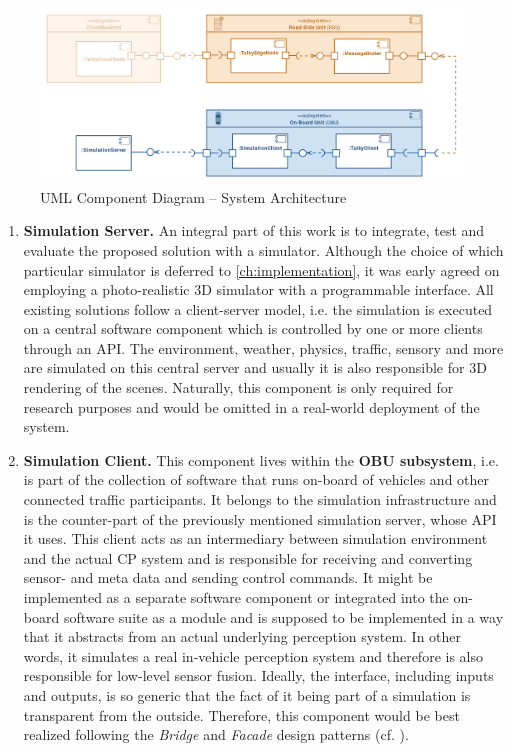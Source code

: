 \begin{figure}
	\centering
	\includegraphics[width=1\linewidth]{98_images/components_plain}
	\caption{UML Component Diagram – System Architecture}
	\label{fig:components_plain}
\end{figure}

\begin{enumerate}[C1: ]
	\item \textbf{Simulation Server.} An integral part of this work is to integrate, test and evaluate the proposed solution with a simulator. Although the choice of which particular simulator is deferred to \cref{ch:implementation}, it was early agreed on employing a photo-realistic 3D simulator with a programmable interface. All existing solutions follow a client-server model, i.e. the simulation is executed on a central software component which is controlled by one or more clients through an API. The environment, weather, physics, traffic, sensory and more are simulated on this central server and usually it is also responsible for 3D rendering of the  scenes. Naturally, this component is only required for research purposes and would be omitted in a real-world deployment of the system.
	\item \textbf{Simulation Client.} This component lives within the \textbf{OBU subsystem}, i.e. is part of the collection of software that runs on-board of vehicles and other connected traffic participants. It belongs to the simulation infrastructure and is the counter-part of the previously mentioned simulation server, whose API it uses. This client acts as an intermediary between simulation environment and the actual CP system and is responsible for receiving and converting sensor- and meta data and sending control commands. It might be implemented as a separate software component or integrated into the on-board software suite as a module and is supposed to be implemented in a way that it abstracts from an actual underlying perception system. In other words, it simulates a real in-vehicle perception system and therefore is also responsible for low-level sensor fusion. Ideally, the interface, including inputs and outputs, is so generic that the fact of it being part of a simulation is transparent from the outside. Therefore, this component would be best realized following the \textit{Bridge} and \textit{Facade} design patterns (cf. \cite{EricFreemanElisabethFreemanBertBates2013}).

\end{enumerate}
